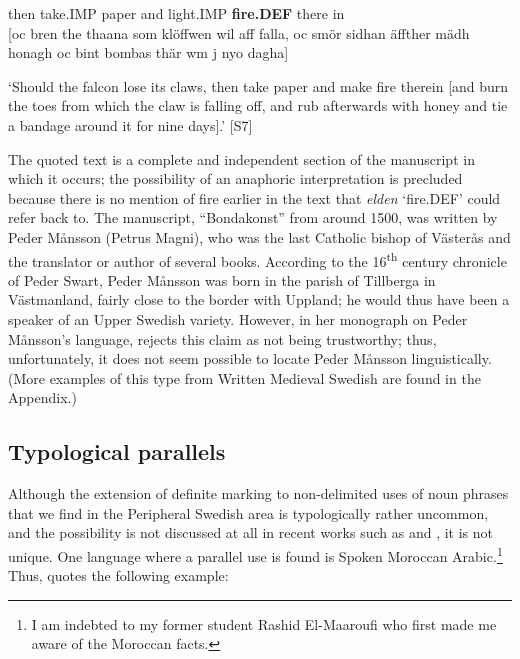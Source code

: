 then  take.IMP  paper  and  light.IMP  \textbf{fire.DEF} there   in\\

[oc bren the thaana som klöffwen wil aff falla, oc smör sidhan äffther mädh honagh oc bint bombas thär wm j nyo dagha]


\glt ‘Should the falcon lose its claws, then take paper and make fire therein [and burn the toes from which the claw is falling off, and rub afterwards with honey and tie a bandage around it for nine days].’ [S7]

\z

The quoted text is a complete and independent section of the manuscript in which it occurs; the possibility of an anaphoric interpretation is precluded because there is no mention of fire earlier in the text that \textit{elden} ‘fire.DEF’ could refer back to. The manuscript, “Bondakonst” from around 1500, was written by Peder Månsson (Petrus Magni), who was the last Catholic bishop of Västerås and the translator or author of several books. According to the 16\textsuperscript{th} century chronicle of Peder Swart, Peder Månsson was born in the parish of Tillberga in Västmanland, fairly close to the border with Uppland; he would thus have been a speaker of an Upper Swedish variety. However, in her monograph on Peder Månsson’s language, \citet[51]{Nordling2001} rejects this claim as not being trustworthy; thus, unfortunately, it does not seem possible to locate Peder Månsson linguistically. (More examples of this type from Written Medieval Swedish are found in the Appendix.) 


\subsection{\rmfamily Typological parallels}
\label{bkm:Ref134937864}
Although the extension of definite marking to non-delimited uses of noun phrases that we find in the Peripheral Swedish area is typologically rather uncommon, and the possibility is not discussed at all in recent works such as \citet{Himmelmann1997} and \citet{Lyons1999}, it is not unique. One language where a parallel use is found is Spoken Moroccan Arabic.\footnote{ I am indebted to my former student Rashid El-Maaroufi who first made me aware of the Moroccan facts. } Thus, \citet[235]{Caubet1983} quotes the following example:

